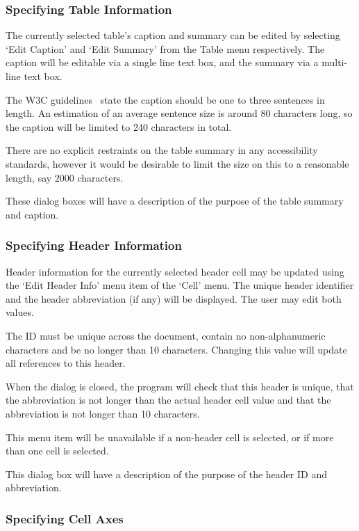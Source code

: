 \subsubsection{Specifying Table Information}

The currently selected table's caption and summary can be edited by selecting
`Edit Caption' and `Edit Summary' from the Table menu respectively. The caption
will be editable via a single line text box, and the summary via a multi-line
text box.

The W3C guidelines~\cite{w3c:wcagtechs} state the caption should be one to
three sentences in length. An estimation of an average sentence size is around
80 characters long, so the caption will be limited to 240 characters in total.

There are no explicit restraints on the table summary in any accessibility
standards, however it would be desirable to limit the size on this to a reasonable
length, say 2000 characters.

These dialog boxes will have a description of the purpose of the table summary
and caption.

\subsubsection{Specifying Header Information}

Header information for the currently selected header cell may be updated using
the `Edit Header Info' menu item of the `Cell' menu. The unique header
identifier and the header abbreviation (if any) will be displayed. The user may
edit both values. 

The ID must be unique across the document, contain no non-alphanumeric
characters and be no longer than 10 characters. Changing this value will update
all references to this header.

When the dialog is closed, the program will check that this header is unique,
that the abbreviation is not longer than the actual header cell value and that
the abbreviation is not longer than 10 characters.

This menu item will be unavailable if a non-header cell is selected, or if more
than one cell is selected.

This dialog box will have a description of the purpose of the header ID and
abbreviation.

\subsubsection{Specifying Cell Axes}

